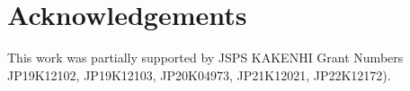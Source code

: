 \section*{Acknowledgements}
This work was partially supported by JSPS KAKENHI Grant Numbers {\color{red} JP19K12102, JP19K12103}, JP20K04973, JP21K12021, JP22K12172). 
